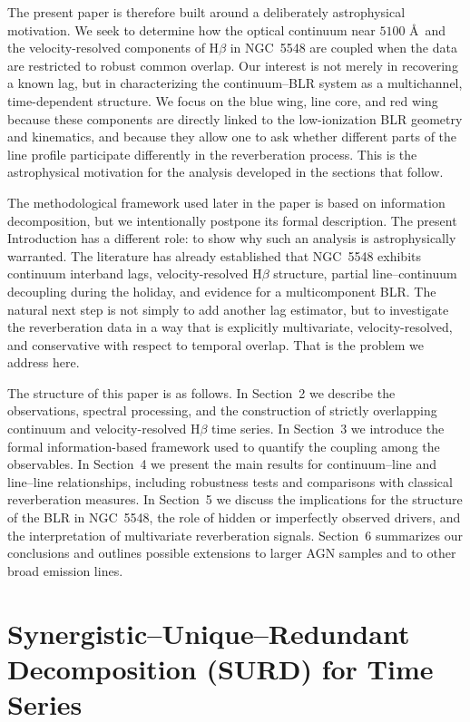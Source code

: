 \documentclass[12pt, a4paper]{article}
\begin{document}
The present paper is therefore built around a deliberately astrophysical motivation. We seek to determine how the optical continuum near \(5100\) \AA\ and the velocity-resolved components of H$\beta$ in NGC~5548 are coupled when the data are restricted to robust common overlap. Our interest is not merely in recovering a known lag, but in characterizing the continuum--BLR system as a multichannel, time-dependent structure. We focus on the blue wing, line core, and red wing because these components are directly linked to the low-ionization BLR geometry and kinematics, and because they allow one to ask whether different parts of the line profile participate differently in the reverberation process. This is the astrophysical motivation for the analysis developed in the sections that follow.

The methodological framework used later in the paper is based on information decomposition, but we intentionally postpone its formal description. The present Introduction has a different role: to show why such an analysis is astrophysically warranted. The literature has already established that NGC~5548 exhibits continuum interband lags, velocity-resolved H$\beta$ structure, partial line--continuum decoupling during the holiday, and evidence for a multicomponent BLR. The natural next step is not simply to add another lag estimator, but to investigate the reverberation data in a way that is explicitly multivariate, velocity-resolved, and conservative with respect to temporal overlap. That is the problem we address here.

The structure of this paper is as follows. In Section~2 we describe the observations, spectral processing, and the construction of strictly overlapping continuum and velocity-resolved H$\beta$ time series. In Section~3 we introduce the formal information-based framework used to quantify the coupling among the observables. In Section~4 we present the main results for continuum--line and line--line relationships, including robustness tests and comparisons with classical reverberation measures. In Section~5 we discuss the implications for the structure of the BLR in NGC~5548, the role of hidden or imperfectly observed drivers, and the interpretation of multivariate reverberation signals. Section~6 summarizes our conclusions and outlines possible extensions to larger AGN samples and to other broad emission lines.


\section{Synergistic--Unique--Redundant Decomposition (SURD) for Time Series}
\label{sec:surd_method}
\end{document}
